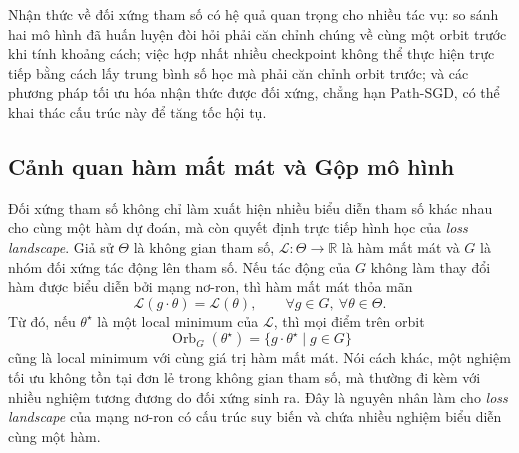 Nhận thức về đối xứng tham số có hệ quả quan trọng cho nhiều tác vụ: so sánh hai mô hình đã huấn luyện đòi hỏi phải căn chỉnh chúng về cùng một orbit trước khi tính khoảng cách; việc hợp nhất nhiều checkpoint không thể thực hiện trực tiếp bằng cách lấy trung bình số học mà phải căn chỉnh orbit trước; và các phương pháp tối ưu hóa nhận thức được đối xứng, chẳng hạn Path-SGD, có thể khai thác cấu trúc này để tăng tốc hội tụ.



\subsection{Cảnh quan hàm mất mát và Gộp mô hình}
\label{subsec:loss-landscape}



Đối xứng tham số không chỉ làm xuất hiện nhiều biểu diễn tham số khác nhau cho cùng một hàm dự đoán, mà còn quyết định trực tiếp hình học của \textit{loss landscape}. Giả sử $\Theta$ là không gian tham số, $\mathcal{L}: \Theta \rightarrow \mathbb{R}$ là hàm mất mát và $G$ là nhóm đối xứng tác động lên tham số. Nếu tác động của $G$ không làm thay đổi hàm được biểu diễn bởi mạng nơ-ron, thì hàm mất mát thỏa mãn
\begin{equation}
    \mathcal{L}(g \cdot \theta) = \mathcal{L}(\theta),
    \qquad \forall g \in G, \ \forall \theta \in \Theta.
    \label{eq:loss-symmetry-invariance}
\end{equation}
Từ đó, nếu $\theta^\star$ là một local minimum của $\mathcal{L}$, thì mọi điểm trên orbit
\begin{equation}
    \operatorname{Orb}_{G}(\theta^\star)
    =
    \{g \cdot \theta^\star \mid g \in G\}
    \label{eq:parameter-orbit-minima}
\end{equation}
cũng là local minimum với cùng giá trị hàm mất mát. Nói cách khác, một nghiệm tối ưu không tồn tại đơn lẻ trong không gian tham số, mà thường đi kèm với nhiều nghiệm tương đương do đối xứng sinh ra. Đây là nguyên nhân làm cho \textit{loss landscape} của mạng nơ-ron có cấu trúc suy biến và chứa nhiều nghiệm biểu diễn cùng một hàm.

